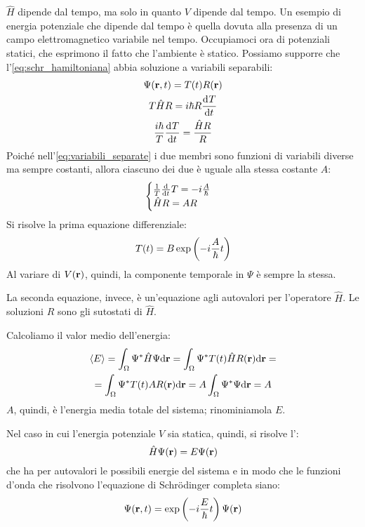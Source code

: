 $\hat{H}$ dipende dal tempo, ma solo in quanto $V$ dipende dal tempo.
Un esempio di energia potenziale che dipende dal tempo è quella dovuta alla presenza di un campo elettromagnetico variabile nel tempo.
Occupiamoci ora di potenziali statici, che esprimono il fatto che l'ambiente è statico.
Possiamo supporre che l'\cref{eq:schr_hamiltoniana} abbia soluzione a variabili separabili:
\begin{gather}
    \Psi(\p, t) = T(t) R(\p) \\
    T \hat{H} R = \im \hbar R \der[T]{t} \\
\label{eq:variabili_separate}
    \frac{\im \hbar}{T} \der[T]{t} = \frac{\hat{H} R}{R}
\end{gather}
Poiché nell'\cref{eq:variabili_separate} i due membri sono funzioni di variabili diverse ma sempre costanti, allora ciascuno dei due è uguale alla stessa costante $A$:
\begin{equation}
    \begin{cases}
        \frac{1}{T} \der[T]{t} = -\im \frac{A}{\hbar} \\
        \hat{H} R = A R
    \end{cases}
\end{equation}
Si risolve la prima equazione differenziale:
\begin{equation}
    T(t) = B \operatorname{exp}\left( -i \frac{A}{\hbar} t \right)
\end{equation}
Al variare di $V(\mathbf{r})$, quindi, la componente temporale in $\Psi$ è sempre la stessa.

La seconda equazione, invece, è un'equazione agli autovalori per l'operatore $\hat{H}$.
Le soluzioni $R$ sono gli sutostati di $\hat{H}$.

Calcoliamo il valor medio dell'energia:
\begin{equation}
\begin{gathered}
    \left\langle E \right\rangle = \int_\Omega \Psi^* \hat{H} \Psi \mathrm{d}\mathbf{r}
    = \int_\Omega \Psi^* T(t) \hat{H} R(\mathbf{r}) \mathrm{d}\mathbf{r} = \\
    = \int_\Omega \Psi^* T(t) A R(\mathbf{r}) \mathrm{d}\mathbf{r}
    = A \int_\Omega \Psi^* \Psi \mathrm{d}\mathbf{r}
    = A
\end{gathered}
\end{equation}
$A$, quindi, è l'energia media totale del sistema;
rinominiamola $E$.

Nel caso in cui l'energia potenziale $V$ sia statica, quindi, si risolve l':
\begin{equation}
    \hat{H} \Psi(\mathbf{r}) = E \Psi(\mathbf{r})
\end{equation}
che ha per autovalori le possibili energie del sistema e in modo che le funzioni d'onda che risolvono l'equazione di Schrödinger completa siano:
\begin{equation}
    \Psi(\mathbf{r}, t) = \operatorname{exp}\left( -i \frac{E}{\hbar} t \right) \Psi(\mathbf{r})
\end{equation}


